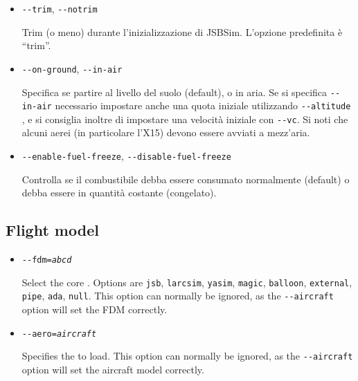 \begin{itemize}
{\begin{itemize}
  Imposta la velocit\`{a} dell'FDM rispetto al tempo reale.

  \item{\texttt{-$ $-trim}, \texttt{-$ $-notrim}}

  Trim (o meno) durante l'inizializzazione di JSBSim. L'opzione predefinita \`{e} ``trim''.

  \item{\texttt{-$ $-on-ground}, \texttt{-$ $-in-air}}

  Specifica se partire al livello del suolo (default), o in aria. Se si specifica \texttt{-$ $-in-air}
  necessario impostare anche una quota iniziale utilizzando \texttt{-$ $-altitude}
  , e si consiglia inoltre di impostare una velocit\`{a} iniziale con
  \texttt{-$ $-vc}. Si noti che alcuni aerei (in particolare l'X15) devono essere avviati a mezz'aria.

  \item{\texttt{-$ $-enable-fuel-freeze}, \texttt{-$ $-disable-fuel-freeze}}

  Controlla se il combustibile debba essere consumato normalmente (default) o
  debba essere in quantit\`{a} costante (congelato).

  \end{itemize}
}
{
  \subsection{Flight model}\label{flight dynamics model}
  \begin{itemize}
  \item{\texttt{-$ $-fdm={\it abcd}}}

  Select the core . Options are \texttt{jsb}, \texttt{larcsim}, \texttt{yasim},
  \texttt{magic}, \texttt{balloon}, \texttt{external}, \texttt{pipe}, \texttt{ada}, \texttt{null}.
  This option can normally be ignored, as the \texttt{-$ $-aircraft} option will set the FDM correctly.

  \item{\texttt{-$ $-aero={\it aircraft}}}

  Specifies the  to load. This option can normally be ignored, as
  the \texttt{-$ $-aircraft} option will set the aircraft model correctly.


\end{itemize}}
\end{itemize}
